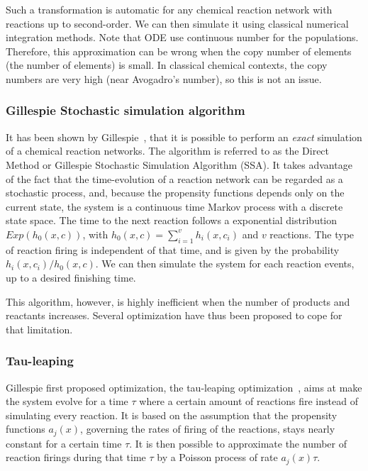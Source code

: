 		Such a transformation is automatic for any chemical reaction network with reactions up to second-order. We can then simulate it using classical numerical integration methods. Note that ODE use continuous number for the populations. Therefore, this approximation can be wrong when the copy number of elements (the number of elements) is small. In classical chemical contexts, the copy numbers are very high (near Avogadro's number), so this is not an issue.
		
		\subsubsection{Gillespie Stochastic simulation algorithm} %
		\label{ssub:stochastic_simulations}
			It has been shown by Gillespie~\cite{Gillespie:2007p1788, Gillespie:1977p5555, Gillespie:1992p8126, Gillespie:2000p5881, Gillespie:1996p4372}, that it is possible to perform an \emph{exact} simulation of a chemical reaction networks. The algorithm is referred to as the Direct Method or Gillespie Stochastic Simulation Algorithm (SSA). It takes advantage of the fact that the time-evolution of a reaction network can be regarded as a stochastic process, and, because the propensity functions depends only on the current state, the system is a continuous time Markov process with a discrete state space. The time to the next reaction follows a exponential distribution $Exp(h_0(x,c))$, with $h_0(x,c) = \sum_{i=1}^v h_i(x,c_i)$ and $v$ reactions. The type of reaction firing is independent of that time, and is given by the probability $h_i(x,c_i)/h_0(x,c)$. We can then simulate the system for each reaction events, up to a desired finishing time.
			
			This algorithm, however, is highly inefficient when the number of products and reactants increases. Several optimization have thus been proposed to cope for that limitation.
		
		\subsubsection{Tau-leaping} %
		\label{ssub:tau_leaping}
		Gillespie first proposed optimization, the tau-leaping optimization~\cite{Gillespie:2001p4354}, aims at make the system evolve for a time $\tau$ where a certain amount of reactions fire instead of simulating every reaction. It is based on the assumption that the propensity functions $a_j(x)$, governing the rates of firing of the reactions, stays nearly constant for a certain time $\tau$. It is then possible to approximate the number of reaction firings during that time $\tau$ by a Poisson process of rate $a_j(x) \tau$.

